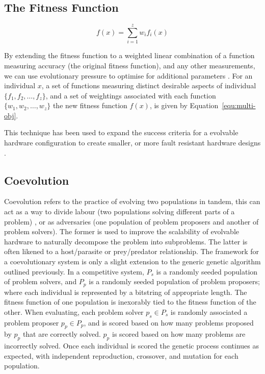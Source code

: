 \subsection{The Fitness Function}

\begin{equation}
	f(x) = \sum_{i=1}^{z} w_i f_i(x)
	\label{equ:multi-obj}
\end{equation}

By extending the fitness function to a weighted linear combination of a function
measuring accuracy (the original fitness function),
and any other measurements, we can use evolutionary pressure to optimise for
additional parameters \cite{deJong:2001:RBP:2955239.2955241}. For an individual
$x$, a set of functions measuring distinct desirable aspects of individual
$\{f_1,f_2,\ldots,f_z\}$, and a set of weightings associated with each function
$\{w_1,w_2,\ldots,w_z\}$ the new fitness function $f(x)$, is given by
Equation~\ref{equ:multi-obj}.

This technique has been used to expand the success criteria for a evolvable hardware configuration
to create smaller, or more fault resistant hardware designs
\cite{Thompson:1998:ADR:645508.656773}\cite{651463}\cite{Keymeulen2000}.

\subsection{Coevolution}

Coevolution refers to the practice of evolving two populations in tandem, this can
act as a way to divide labour (two populations solving different parts of a problem)
 \cite{Potter:2000:CCA:1108888.1108890},
or as adversaries (one population of problem proposers and another of problem solvers).
The former is used to improve the scalability of evolvable hardware to naturally
decompose the problem into subproblems.
The latter is often likened to a host/parasite or prey/predator relationship.
The framework for a coevolutionary system is only a slight extension to the
generic genetic algorithm outlined previously. In a competitive system, $P_s$ is a randomly
seeded population of problem solvers, and $P_p$ is a randomly seeded population
of problem proposers; where each individual is represented by a bitstring of
appropriate length. The fitness function of one population is inexorably tied to
the fitness function of the other.
When evaluating, each problem solver $p_s \in P_s$ is randomly associated
a problem proposer $p_p \in P_p$, and is scored based on how many problems proposed by
$p_p$ that are correctly solved. $p_p$ is scored based on how many problems
are incorrectly solved. Once each individual is scored the genetic process continues as expected,
with independent reproduction, crossover, and mutation for each population.

